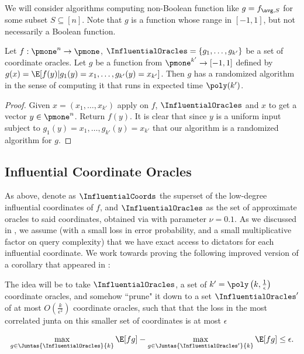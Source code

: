 We will consider algorithms computing non-Boolean function like $g = f_{\avg, S}$ for some subset $S \subseteq [n]$. Note that $g$ is a function whose range in $[-1,1]$, but not necessarily a Boolean function.
\begin{theorem}
\label{theorem:implicit-junta-access}
	Let $f: \pmone^n \to \pmone$, $\InfluentialOracles = \{g_1, \ldots, g_{k'}\}$ be a set of coordinate oracles.
	Let $g$ be a function from $\pmone^{k'} \to [-1,1]$ defined by $g(x) = \E[f(y) | g_1(y)=x_1, \ldots, g_{k'}(y)=x_{k'}]$. Then $g$ has a randomized algorithm in the sense of  computing it that runs in expected time $\poly(k')$. 
\end{theorem}
\begin{proof}
	Given $x = (x_1, \ldots,x_{k'})$ apply  on $f$, $\InfluentialOracles$ and $x$ to get a vector $y\in \pmone^n$. Return $f(y)$.
	It is clear that since $y$ is a uniform input subject to $g_1(y)=x_1, \ldots, g_{k'}(y)=x_{k'}$ that our algorithm is a randomized algorithm for $g$.
\end{proof}

\subsection{Influential Coordinate Oracles}

 As above, denote as $\InfluentialCoords$ the  superset of the low-degree influential coordinates of $f$, and $\InfluentialOracles$ as the set of approximate oracles to said coordinates, obtained via  with parameter $\nu = 0.1$. As we discussed in , we assume (with a small loss in error probability, and a small multiplicative factor on query complexity) that we have exact access to dictators for each influential coordinate. We work towards proving the following improved version of a corollary that appeared in \cite{junta-coordinate-oracles}:

 The idea will be to take $\InfluentialOracles$, a set of $k' = \poly\left(k, \frac{1}{\epsilon}\right)$ coordinate oracles, and somehow ``prune" it down to a set  $\InfluentialOracles'$ of at most $O(\frac{k}{\epsilon^2})$ coordinate oracles, such that that the loss in the most correlated junta on this smaller set of coordinates is at most $\epsilon$ 

$$\max_{g \in \Juntas{\InfluentialOracles}{k}} \E[fg] - \max_{g \in \Juntas{\InfluentialOracles'}{k}} \E[fg] \leq \epsilon.$$
